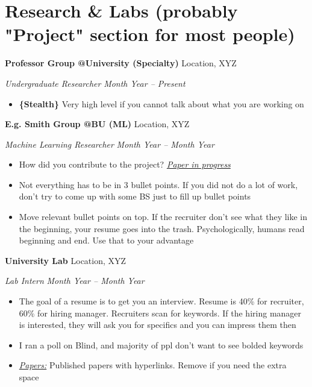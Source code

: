 \documentclass[letterpaper,10pt]{article}
\begin{document}
    \vspace{-5pt}
    
\section{Research \& Labs (probably "Project" section for most people)}

    \textbf {Professor Group @University (Specialty)} \hfill Location, XYZ
    
    \textit { Undergraduate Researcher}
    \hfill \textit {Month Year -- Present}
    \begin{itemize}[noitemsep, nolistsep]
    \renewcommand\labelitemi{\scriptsize$\bullet$}
        \item \textbf{\{Stealth\}} Very high level if you cannot talk about what you are working on

    \end{itemize}
    
    \vspace{2.5mm}

    \textbf {E.g. Smith Group @BU (ML)} \hfill Location, XYZ
    
    \textit { Machine Learning Researcher}
    \hfill \textit {Month Year -- Month Year}
    \begin{itemize}[noitemsep, nolistsep]
    \renewcommand\labelitemi{\scriptsize$\bullet$}
        \item How did you contribute to the project? \textit{\underline{Paper in progress}}
        \item Not everything has to be in 3 bullet points. If you did not do a lot of work, don't try to come up with some BS just to fill up bullet points
        \item Move relevant bullet points on top. If the recruiter don't see what they like in the beginning, your resume goes into the trash. Psychologically, humans read beginning and end. Use that to your advantage
    \end{itemize}
    
    \vspace{2.25mm}
    
    \textbf {University Lab} \hfill Location, XYZ
    
    \textit { Lab Intern}
    \hfill \textit {Month Year -- Month Year}
    \begin{itemize}[noitemsep, nolistsep]
    \renewcommand\labelitemi{\scriptsize$\bullet$}
        \item The goal of a resume is to get you an interview. Resume is 40\% for recruiter, 60\% for hiring manager. Recruiters scan for keywords. If the hiring manager is interested, they will ask you for specifics and you can impress them then
        \item I ran a poll on Blind, and majority of ppl don't want to see bolded keywords
        \item\textit {\underline{Papers:}} Published papers with hyperlinks. Remove if you need the extra space
    \end{itemize}
    
\end{document}

